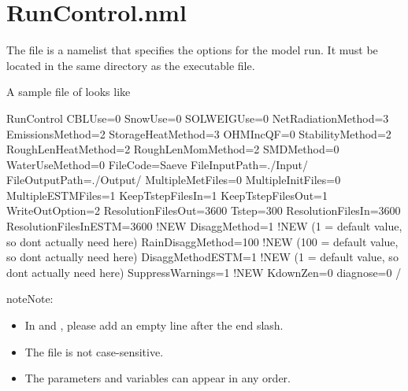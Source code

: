 \documentclass[letterpaper,10pt,english]{sphinxmanual}
\begin{document}
\section{RunControl.nml}
\label{\detokenize{input_files/RunControl/RunControl:runcontrol}}\label{\detokenize{input_files/RunControl/RunControl:runcontrol-nml}}\label{\detokenize{input_files/RunControl/RunControl::doc}}\label{\detokenize{input_files/RunControl/RunControl:id1}}
The file  is a namelist that specifies the options for
the model run. It must be located in the same directory as the
executable file.

A sample file of  looks like

%
\begin{sphinxVerbatim}[commandchars=\\\{\}]
\PYGZam{}RunControl
CBLUse=0
SnowUse=0
SOLWEIGUse=0
NetRadiationMethod=3 
EmissionsMethod=2
StorageHeatMethod=3
OHMIncQF=0
StabilityMethod=2
RoughLenHeatMethod=2
RoughLenMomMethod=2
SMDMethod=0
WaterUseMethod=0
FileCode=\PYGZsq{}Saeve\PYGZsq{}
FileInputPath=\PYGZdq{}./Input/\PYGZdq{}
FileOutputPath=\PYGZdq{}./Output/\PYGZdq{}
MultipleMetFiles=0
MultipleInitFiles=0
MultipleESTMFiles=1
KeepTstepFilesIn=1
KeepTstepFilesOut=1
WriteOutOption=2
ResolutionFilesOut=3600
Tstep=300
ResolutionFilesIn=3600
ResolutionFilesInESTM=3600  !NEW
DisaggMethod=1          !NEW  (1 = default value, so don\PYGZsq{}t actually need here)
RainDisaggMethod=100    !NEW  (100 = default value, so don\PYGZsq{}t actually need here)
DisaggMethodESTM=1      !NEW  (1 = default value, so don\PYGZsq{}t actually need here)
SuppressWarnings=1      !NEW
KdownZen=0
diagnose=0
/
\end{sphinxVerbatim}

\begin{sphinxadmonition}{note}{Note:}\begin{itemize}
\item {} 
In  and , please add an empty line after the end slash.

\item {} 
The file is not case-sensitive.

\item {} 
The parameters and variables can appear in any order.

\end{itemize}
\end{sphinxadmonition}
\end{document}
